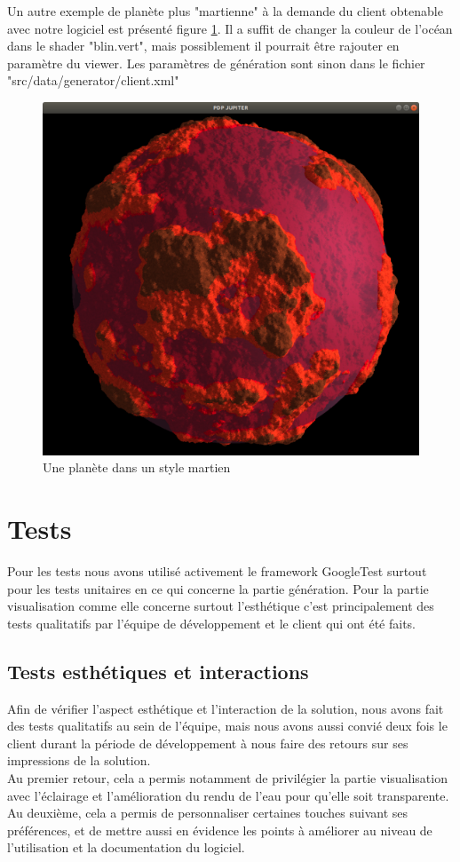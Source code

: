 \documentclass[a4paper]{article}
\begin{document}
\newpage
Un autre exemple de planète plus "martienne" à la demande du client obtenable avec notre logiciel est présenté figure \ref{notre_planete_mars}. Il a suffit de changer la couleur de l'océan dans le shader "blin.vert", mais possiblement il pourrait être rajouter en paramètre du viewer. Les paramètres de génération sont sinon dans le fichier "src/data/generator/client.xml"

\begin{figure}[!ht]
    \begin{center}
        \includegraphics[width=0.6\linewidth]{img/notre_planete_mars.png} 
        \caption{Une planète dans un style martien}
        \label{notre_planete_mars}
    \end{center}
\end{figure}

\newpage 
\section{Tests}

Pour les tests nous avons utilisé activement le framework GoogleTest surtout pour les tests unitaires en ce qui concerne la partie génération. 
Pour la partie visualisation comme elle concerne surtout l'esthétique c'est principalement des tests qualitatifs par l'équipe de développement et le client qui ont été faits.

\subsection{Tests esthétiques et interactions}

Afin de vérifier l'aspect esthétique et l'interaction de la solution, nous avons fait des tests qualitatifs au sein de l'équipe, mais nous avons aussi convié deux fois le client durant la période de développement à nous faire des retours sur ses impressions de la solution.\\
Au premier retour, cela a permis notamment de privilégier la partie visualisation avec l'éclairage et l'amélioration du rendu de l'eau pour qu'elle soit transparente. \\
Au deuxième, cela a permis de personnaliser certaines touches suivant ses préférences, et de mettre aussi en évidence les points à améliorer au niveau de l'utilisation et la documentation du logiciel.
\end{document}
